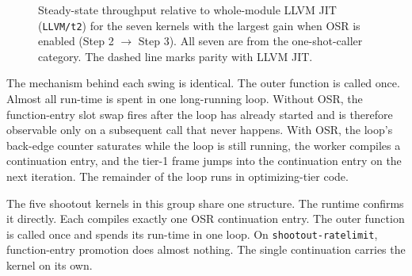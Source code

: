 \begin{figure}[h]
\centering
{}
\caption{Steady-state throughput relative to whole-module LLVM JIT (\texttt{LLVM/t2}) for the seven kernels with the largest gain when OSR is enabled (Step 2 $\to$ Step 3). All seven are from the one-shot-caller category. The dashed line marks parity with LLVM JIT.}
\label{fig:eval:osr}
\end{figure}

The mechanism behind each swing is identical. The outer function is called once. Almost all run-time is spent in one long-running loop. Without OSR, the function-entry slot swap fires after the loop has already started and is therefore observable only on a subsequent call that never happens. With OSR, the loop's back-edge counter saturates while the loop is still running, the worker compiles a continuation entry, and the tier-1 frame jumps into the continuation entry on the next iteration. The remainder of the loop runs in optimizing-tier code.

The five shootout kernels in this group share one structure. The runtime confirms it directly. Each compiles exactly one OSR continuation entry. The outer function is called once and spends its run-time in one loop. On \texttt{shootout-ratelimit}, function-entry promotion does almost nothing. The single continuation carries the kernel on its own.

